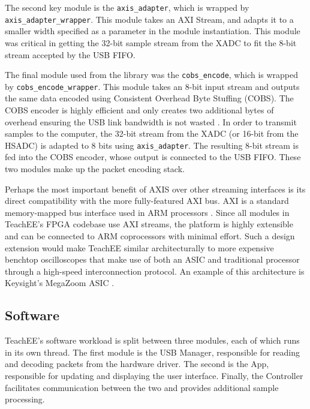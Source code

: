 \documentclass[letterpaper,11pt]{article}
\newcommand{\code}[1]{\texttt{#1}}
\begin{document}
The second key module is the \code{axis_adapter}, which is wrapped by
\code{axis_adapter_wrapper}. This module takes an AXI Stream, and adapts it to a
smaller width specified as a parameter in the module instantiation. This module
was critical in getting the 32-bit sample stream from the XADC to fit the 8-bit
stream accepted by the USB FIFO.

The final module used from the library was the \code{cobs_encode}, which is
wrapped by \code{cobs_encode_wrapper}. This module takes an 8-bit input stream
and outputs the same data encoded using Consistent Overhead Byte Stuffing
(COBS). The COBS encoder is highly efficient and only creates two additional
bytes of overhead ensuring the USB link bandwidth is not wasted \cite{cobs}.
In order to transmit samples to the computer, the 32-bit stream from the XADC
(or 16-bit from the HSADC) is adapted to 8 bits using \code{axis_adapter}. The
resulting 8-bit stream is fed into the COBS encoder, whose output is connected
to the USB FIFO. These two modules make up the packet encoding stack.

Perhaps the most important benefit of AXIS over other streaming interfaces is
its direct compatibility with the more fully-featured AXI bus. AXI is a standard
memory-mapped bus interface used in ARM processors \cite{axi_spec}. Since all
modules in TeachEE's FPGA codebase use AXI streams, the platform is highly
extensible and can be connected to ARM coprocessors with minimal effort. Such a
design extension would make TeachEE similar architecturally to more expensive
benchtop oscilloscopes that make use of both an ASIC and traditional processor
through a high-speed interconnection protocol. An example of this architecture
is Keysight's MegaZoom ASIC \cite{keysight_megazoom}.

\subsection{Software} \label{sec:software-impl} %
TeachEE's software workload is split between three modules, each of which runs in its
own thread. The first module is the USB Manager, responsible for reading and decoding
packets from the hardware driver. The second is the App, responsible for updating and
displaying the user interface. Finally, the Controller facilitates communication between
the two and provides additional sample processing.
\end{document}
